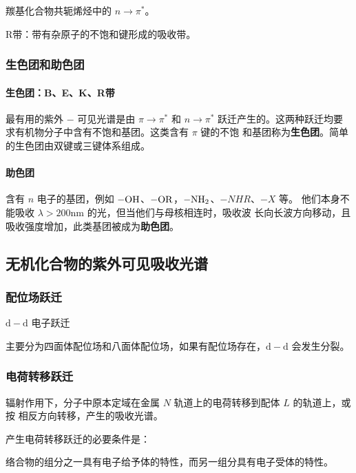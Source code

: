 羰基化合物共轭烯烃中的 $n \rightarrow \pi^*$。

R带：带有杂原子的不饱和键形成的吸收带。

\subsubsection{生色团和助色团}

\paragraph{生色团：B、E、K、R带}

最有用的紫外 $-$ 可见光谱是由 $\pi \rightarrow \pi^*$ 和 $n \rightarrow \pi^*$
跃迁产生的。这两种跃迁均要求有机物分子中含有不饱和基团。这类含有 $\pi$ 键的不饱
和基团称为\textbf{生色团}。简单的生色团由双键或三键体系组成。

\paragraph{助色团}

含有 $n$ 电子的基团，例如 $\ce{-OH}$、$\ce{-OR}$，$\ce{-NH2}$、$-NHR$、$-X$ 等。
他们本身不能吸收 $\lambda > 200 \mathrm{nm}$ 的光，但当他们与母核相连时，吸收波
长向长波方向移动，且吸收强度增加，此类基团被成为\textbf{助色团}。

\subsection{无机化合物的紫外可见吸收光谱}

\subsubsection{配位场跃迁}

$\mathrm{d} - \mathrm{d}$ 电子跃迁

主要分为四面体配位场和八面体配位场，如果有配位场存在，$\mathrm{d} - \mathrm{d}$
会发生分裂。

\subsubsection{电荷转移跃迁}

辐射作用下，分子中原本定域在金属 $N$ 轨道上的电荷转移到配体 $L$ 的轨道上，或按
相反方向转移，产生的吸收光谱。

产生电荷转移跃迁的必要条件是：

络合物的组分之一具有电子给予体的特性，而另一组分具有电子受体的特性。

